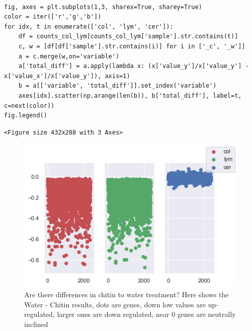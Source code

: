 \documentclass[11pt]{article}
\begin{document}
\begin{verbatim}

fig, axes = plt.subplots(1,3, sharex=True, sharey=True)
color = iter(['r','g','b'])
for idx, t in enumerate(['col', 'lym', 'cer']):
    df = counts_col_lym[counts_col_lym['sample'].str.contains(t)]
    c, w = [df[df['sample'].str.contains(i)] for i in ['_c', '_w']]
    a = c.merge(w,on='variable')
    a['total_diff'] = a.apply(lambda x: (x['value_y']/x['value_y'] - x['value_x']/x['value_y']), axis=1)
    b = a[['variable', 'total_diff']].set_index('variable')
    axes[idx].scatter(np.arange(len(b)), b['total_diff'], label=t, c=next(color))
fig.legend()

\end{verbatim}

\begin{verbatim}
<Figure size 432x288 with 3 Axes>
\end{verbatim}


\begin{figure}[htbp]
\centering
\includegraphics[width=15cm]{obipy-resources/test_water_chitin.png}
\caption{\label{test_water_chitin.png}
Are there differences in chitin to water treatment? Here shows the Water - Chitin results, dots are genes, down low values are up-regulated, larger ones are down regulated, near 0 genes are neutrally inclined}
\end{figure}
\end{document}
